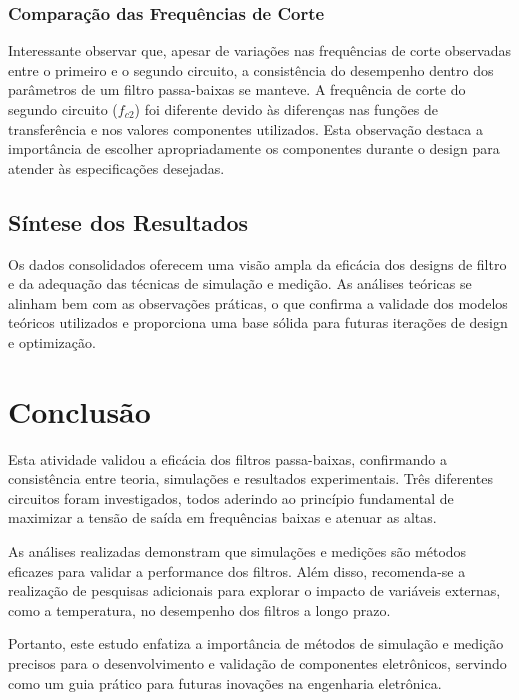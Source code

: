 \documentclass[
	12pt,				%
	openright,			%
	twoside,			%
	a4paper,			%
	english,			%
	french,				%
	spanish,			%
	brazil,				%
	]{abntex2}
\begin{document}
\subsection{Comparação das Frequências de Corte}

Interessante observar que, apesar de variações nas frequências de corte observadas entre o primeiro e o segundo circuito, a consistência do desempenho dentro dos parâmetros de um filtro passa-baixas se manteve. A frequência de corte do segundo circuito (\( f_{c2} \)) foi diferente devido às diferenças nas funções de transferência e nos valores componentes utilizados. Esta observação destaca a importância de escolher apropriadamente os componentes durante o design para atender às especificações desejadas.

\section{Síntese dos Resultados}

Os dados consolidados oferecem uma visão ampla da eficácia dos designs de filtro e da adequação das técnicas de simulação e medição. As análises teóricas se alinham bem com as observações práticas, o que confirma a validade dos modelos teóricos utilizados e proporciona uma base sólida para futuras iterações de design e optimização.


\chapter{Conclusão}

Esta atividade validou a eficácia dos filtros passa-baixas, confirmando a consistência entre teoria, simulações e resultados experimentais. Três diferentes circuitos foram investigados, todos aderindo ao princípio fundamental de maximizar a tensão de saída em frequências baixas e atenuar as altas. 

As análises realizadas demonstram que simulações e medições são métodos eficazes para validar a performance dos filtros. Além disso, recomenda-se a realização de pesquisas adicionais para explorar o impacto de variáveis externas, como a temperatura, no desempenho dos filtros a longo prazo.

Portanto, este estudo enfatiza a importância de métodos de simulação e medição precisos para o desenvolvimento e validação de componentes eletrônicos, servindo como um guia prático para futuras inovações na engenharia eletrônica.




\clearpage

\end{document}
